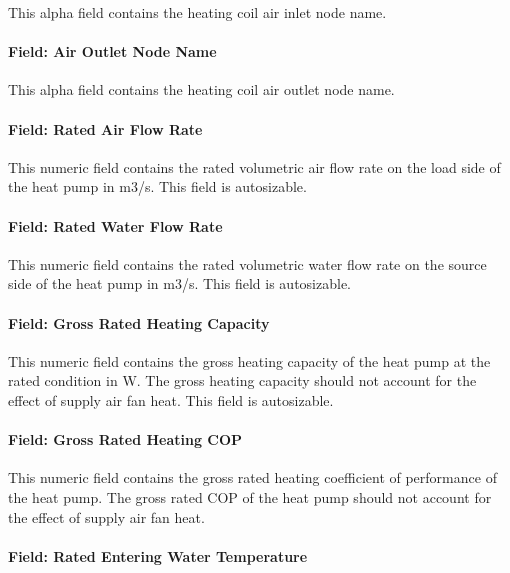 This alpha field contains the heating coil air inlet node name.

\paragraph{Field: Air Outlet Node Name}\label{field-air-outlet-node-name-20}

This alpha field contains the heating coil air outlet node name.

\paragraph{Field: Rated Air Flow Rate}\label{field-rated-air-flow-rate-6}

This numeric field contains the rated volumetric air flow rate on the load side of the heat pump in m3/s. This field is autosizable.

\paragraph{Field: Rated Water Flow Rate}\label{field-rated-water-flow-rate-1}

This numeric field contains the rated volumetric water flow rate on the source side of the heat pump in m3/s. This field is autosizable.

\paragraph{Field: Gross Rated Heating Capacity}\label{field-gross-rated-heating-capacity-4}

This numeric field contains the gross heating capacity of the heat pump at the rated condition in W. The gross heating capacity should not account for the effect of supply air fan heat. This field is autosizable.

\paragraph{Field: Gross Rated Heating COP}\label{field-gross-rated-heating-cop-1}

This numeric field contains the gross rated heating coefficient of performance of the heat pump. The gross rated COP of the heat pump should not account for the effect of supply air fan heat.

\paragraph{Field: Rated Entering Water Temperature}\label{field-rated-entering-water-temperature-1}

